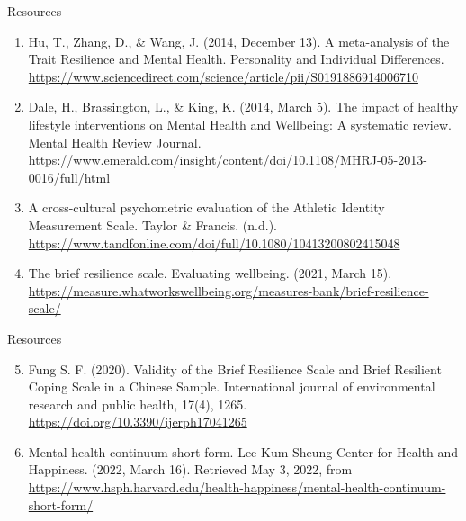 \documentclass[
  ignorenonframetext,
]{beamer}
\begin{document}
\begin{frame}{Resources}
\protect\hypertarget{resources}{}
\begin{enumerate}
\item
  Hu, T., Zhang, D., \& Wang, J. (2014, December 13). A meta-analysis of
  the Trait Resilience and Mental Health. Personality and Individual
  Differences.
  \url{https://www.sciencedirect.com/science/article/pii/S0191886914006710}
\item
  Dale, H., Brassington, L., \& King, K. (2014, March 5). The impact of
  healthy lifestyle interventions on Mental Health and Wellbeing: A
  systematic review. Mental Health Review Journal.
  \url{https://www.emerald.com/insight/content/doi/10.1108/MHRJ-05-2013-0016/full/html}
\item
  A cross-cultural psychometric evaluation of the Athletic Identity
  Measurement Scale. Taylor \& Francis. (n.d.).
  \url{https://www.tandfonline.com/doi/full/10.1080/10413200802415048}
\item
  The brief resilience scale. Evaluating wellbeing. (2021, March 15).
  \url{https://measure.whatworkswellbeing.org/measures-bank/brief-resilience-scale/}
\end{enumerate}
\end{frame}

\begin{frame}{Resources}
\protect\hypertarget{resources-1}{}
\begin{enumerate}
\setcounter{enumi}{4}
\item
  Fung S. F. (2020). Validity of the Brief Resilience Scale and Brief
  Resilient Coping Scale in a Chinese Sample. International journal of
  environmental research and public health, 17(4), 1265.
  \url{https://doi.org/10.3390/ijerph17041265}
\item
  Mental health continuum short form. Lee Kum Sheung Center for Health
  and Happiness. (2022, March 16). Retrieved May 3, 2022, from
  \url{https://www.hsph.harvard.edu/health-happiness/mental-health-continuum-short-form/}
\end{enumerate}
\end{frame}
\end{document}
